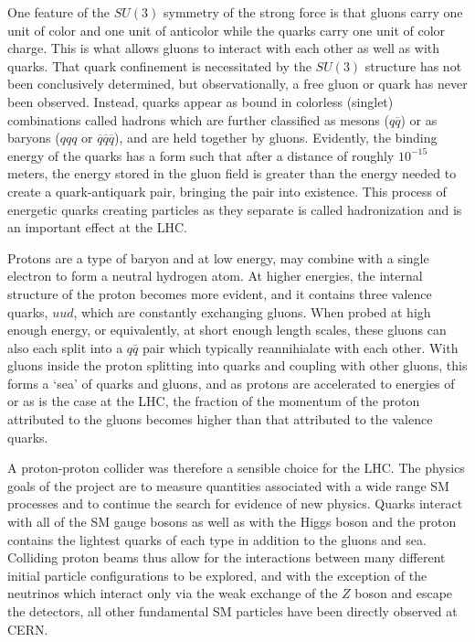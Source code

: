  One feature of the $SU(3)$ symmetry of the
  strong force is that gluons
  carry one unit of color and one unit of anticolor
  while the quarks carry one unit of color charge.
 This is what allows gluons to interact with each other
  as well as with quarks.
 That quark confinement is necessitated by the $SU(3)$
  structure has not been conclusively determined, 
  but observationally, a free gluon or quark has 
  never been observed.
 Instead, quarks appear as bound in colorless (singlet)
  combinations called hadrons
  which are further classified as mesons ($q\overline{q}$)
  or as baryons ($qqq$ or
  $\overline{q}\overline{q}\overline{q}$),
  and are held together by gluons.
 Evidently, the binding energy of the
  quarks has a form such that
  after a distance of roughly $10^{-15}$ meters,
  the energy
  stored in the gluon field is greater
  than the energy needed to create a
  quark-antiquark pair, bringing the pair
  into existence.
 This process of energetic quarks
  creating particles as they
  separate is called hadronization
  and is an important effect at the LHC.

 Protons are a type of baryon and
  at low energy, may combine with a single electron 
  to form a neutral hydrogen atom.
 At higher energies, the internal structure 
  of the proton becomes more evident,
  and it contains three valence quarks, $uud$, 
  which are constantly exchanging gluons.
 When probed at high enough energy, or equivalently,
  at short enough length scales, these 
  gluons can also each split into a $q\overline{q}$ pair 
  which typically reannihialate with each other.
 With gluons inside the proton splitting into quarks
  and coupling with other gluons,
  this forms a `sea' of quarks and gluons,
  and as protons are accelerated
  to energies of \GeV or \TeV as is the case at the
  LHC, the fraction of the momentum of the
  proton attributed to the gluons becomes higher 
  than that attributed to the valence quarks.

 A proton-proton collider was therefore a 
  sensible choice for the LHC. 
 The physics goals of the project are
  to measure quantities associated with a wide range SM 
  processes and to continue the search for 
  evidence of new physics.
 Quarks interact with all of the SM gauge bosons
  as well as with the Higgs boson
  and the proton contains the lightest
  quarks of each type
  in addition to the gluons and sea.
 Colliding proton beams thus allow for
  the interactions between many different
  initial particle configurations to be explored,
  and with the exception of the neutrinos which 
  interact only via the weak exchange of the $Z$
  boson and escape the detectors,
  all other fundamental SM particles have been
  directly  observed  at CERN. 

